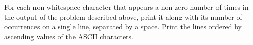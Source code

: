 

For each non-whitespace character that appears a non-zero 
number of times in the output of the problem described above,
print it along with its number of occurrences on a single 
line, separated by a space. Print the lines ordered by 
ascending values of the ASCII characters. 
